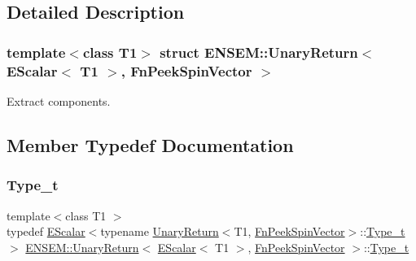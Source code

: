 \subsection{Detailed Description}
\subsubsection*{template$<$class T1$>$\newline
struct E\+N\+S\+E\+M\+::\+Unary\+Return$<$ E\+Scalar$<$ T1 $>$, Fn\+Peek\+Spin\+Vector $>$}

Extract components. 

\subsection{Member Typedef Documentation}
\mbox{\label{structENSEM_1_1UnaryReturn_3_01EScalar_3_01T1_01_4_00_01FnPeekSpinVector_01_4_ab36dc210813249d571d0447c7da504ac}} 
\subsubsection{\texorpdfstring{Type\_t}{Type\_t}\hspace{0.1cm}{\footnotesize\ttfamily [1/3]}}
{\footnotesize\ttfamily template$<$class T1 $>$ \\
typedef \mbox{\hyperlink{classENSEM_1_1EScalar}{E\+Scalar}}$<$typename \mbox{\hyperlink{structENSEM_1_1UnaryReturn}{Unary\+Return}}$<$T1, \mbox{\hyperlink{structENSEM_1_1FnPeekSpinVector}{Fn\+Peek\+Spin\+Vector}}$>$\+::\mbox{\hyperlink{structENSEM_1_1UnaryReturn_3_01EScalar_3_01T1_01_4_00_01FnPeekSpinVector_01_4_ab36dc210813249d571d0447c7da504ac}{Type\+\_\+t}}$>$ \mbox{\hyperlink{structENSEM_1_1UnaryReturn}{E\+N\+S\+E\+M\+::\+Unary\+Return}}$<$ \mbox{\hyperlink{classENSEM_1_1EScalar}{E\+Scalar}}$<$ T1 $>$, \mbox{\hyperlink{structENSEM_1_1FnPeekSpinVector}{Fn\+Peek\+Spin\+Vector}} $>$\+::\mbox{\hyperlink{structENSEM_1_1UnaryReturn_3_01EScalar_3_01T1_01_4_00_01FnPeekSpinVector_01_4_ab36dc210813249d571d0447c7da504ac}{Type\+\_\+t}}}

\mbox{\label{structENSEM_1_1UnaryReturn_3_01EScalar_3_01T1_01_4_00_01FnPeekSpinVector_01_4_ab36dc210813249d571d0447c7da504ac}} 

